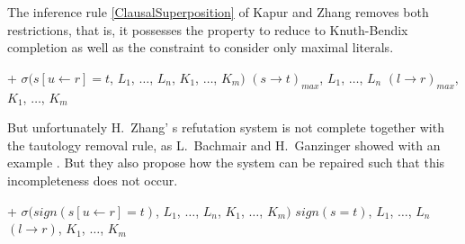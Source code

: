 The inference rule \ref{ClausalSuperposition} 
of Kapur and Zhang \cite{ZhKa88} removes both restrictions, that is, 
it possesses the property to reduce to Knuth-Bendix completion as well 
as the constraint to consider only maximal literals.

\begin{Def}
\return\vspace{-3mm}
\label{ClausalSuperposition}

\hlineblocktwo%
{+}%
{$\sigma(s[u\leftarrow r] = t$, $L_1$, $\dots$, $L_n$, $K_1$,
$\dots$, $K_m)$}%
{$(s \rightarrow t)_{max}$, $L_1$, $\dots$, $L_n$}%
{$(l \rightarrow r)_{max}$, $K_1$, $\dots$, $K_m$}
\end{Def}

But unfortunately H.\ Zhang' s refutation system is not complete together
with the tautology removal rule, as L.\
Bachmair and H.\ Ganzinger showed with an example \cite{BaGa90}. But they
also propose how the system can be repaired such that this incompleteness
does not occur.


\begin{Def}
\return\vspace{-3mm}
\label{StrictSuperposition}

\hlineblocktwo%
{+}%
{$\sigma(sign(s[u\leftarrow r] = t)$, $L_1$, $\dots$, $L_n$, $K_1$,
$\dots$, $K_m)$}%
{$sign(s = t)$, $L_1$, $\dots$, $L_n$}%
{$(l \rightarrow r)$, $K_1$, $\dots$, $K_m$}
\end{Def}


